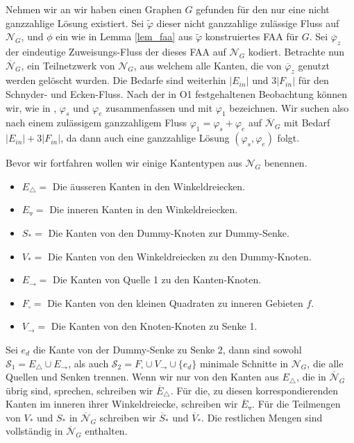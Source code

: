 Nehmen wir an wir haben einen Graphen $G$ gefunden für den nur eine nicht ganzzahlige Lösung existiert. Sei $\tilde{\varphi}$ dieser nicht ganzzahlige zulässige Fluss auf $\mathcal{N}_G$, und $\phi$ ein wie in Lemma \ref{lem_faa} aus $\tilde{\varphi}$ konstruiertes FAA für $G$. Sei $\overline{\varphi}_z$ der eindeutige Zuweisungs-Fluss der dieses FAA auf $\mathcal{N}_G$ kodiert. Betrachte nun $\overline{\mathcal{N}}_G$, ein Teilnetzwerk von $\mathcal{N}_G$, aus welchem alle Kanten, die von $\overline{\varphi}_z$ genutzt werden gelöscht wurden. Die Bedarfe sind weiterhin $|E_{in}|$ und $3|F_{in}|$ für den Schnyder- und Ecken-Fluss. Nach der in O1 festgehaltenen Beobachtung können wir, wie in \cite{af15}, $\varphi_s$ und $\varphi_e$ zusammenfassen und mit $\varphi_1$ bezeichnen. Wir suchen also nach einem zulässigem ganzzahligem Fluss $\varphi_1 = \varphi_s + \varphi_e$ auf $\overline{\mathcal{N}}_G$ mit Bedarf $|E_{in}| + 3|F_{in}|$, da dann auch eine ganzzahlige Lösung $(\varphi_s,\varphi_e)$ folgt.

Bevor wir fortfahren wollen wir einige Kantentypen aus $\mathcal{N}_G$ benennen.

\begin{itemize}
\item $E_\triangle = $ Die äusseren Kanten in den Winkeldreiecken.
\item $E_\triangledown = $ Die inneren Kanten in den Winkeldreiecken.
\item $S_* =$ Die Kanten von den Dummy-Knoten zur Dummy-Senke.
\item $V_* = $ Die Kanten von den Winkeldreiecken zu den Dummy-Knoten.
\item $E_{\to} = $ Die Kanten von Quelle 1 zu den Kanten-Knoten.
\item $F_\square = $ Die Kanten von den kleinen Quadraten zu inneren Gebieten $f$.
\item $V_{\to} = $ Die Kanten von den Knoten-Knoten zu Senke 1.
\end{itemize}

Sei $e_{d}$ die Kante von der Dummy-Senke zu Senke 2, dann sind sowohl $\mathcal{S}_1 = E_\triangle \cup E_{\to}$, als auch $\mathcal{S}_2 = F_\square \cup V_{\to} \cup \{e_{d}\}$ minimale Schnitte in $\mathcal{N}_G$, die alle Quellen und Senken trennen. Wenn wir nur von den Kanten aus $E_\triangle$, die in $\overline{\mathcal{N}}_G$ übrig sind, sprechen, schreiben wir $\overline{E}_\triangle$. Für die, zu diesen korrespondierenden Kanten im inneren ihrer Winkeldreiecke, schreiben wir $\overline{E}_\triangledown$. Für die Teilmengen von $V_*$ und $S_*$ in $\overline{\mathcal{N}}_G$ schreiben wir $\overline{S}_*$ und $\overline{V}_*$. Die restlichen Mengen sind vollständig in $\overline{\mathcal{N}}_G$ enthalten.

